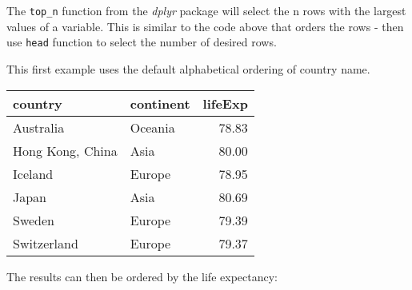 \documentclass[]{book}
\newenvironment{Shaded}{\begin{snugshade}}{\end{snugshade}}
\newcommand{\KeywordTok}[1]{\textcolor[rgb]{0.13,0.29,0.53}{\textbf{#1}}}
\newcommand{\DataTypeTok}[1]{\textcolor[rgb]{0.13,0.29,0.53}{#1}}
\newcommand{\DecValTok}[1]{\textcolor[rgb]{0.00,0.00,0.81}{#1}}
\newcommand{\StringTok}[1]{\textcolor[rgb]{0.31,0.60,0.02}{#1}}
\newcommand{\OperatorTok}[1]{\textcolor[rgb]{0.81,0.36,0.00}{\textbf{#1}}}
\newcommand{\NormalTok}[1]{#1}
\begin{document}
The \texttt{top\_n} function from the \emph{dplyr} package will select
the n rows with the largest values of a variable. This is similar to the
code above that orders the rows - then use \texttt{head} function to
select the number of desired rows.

This first example uses the default alphabetical ordering of country
name.

\begin{Shaded}
\end{Shaded}

\begin{tabular}{l|l|r}
\hline
country & continent & lifeExp\\
\hline
Australia & Oceania & 78.83\\
\hline
Hong Kong, China & Asia & 80.00\\
\hline
Iceland & Europe & 78.95\\
\hline
Japan & Asia & 80.69\\
\hline
Sweden & Europe & 79.39\\
\hline
Switzerland & Europe & 79.37\\
\hline
\end{tabular}

The results can then be ordered by the life expectancy:

\begin{Shaded}
\end{Shaded}
\end{document}
